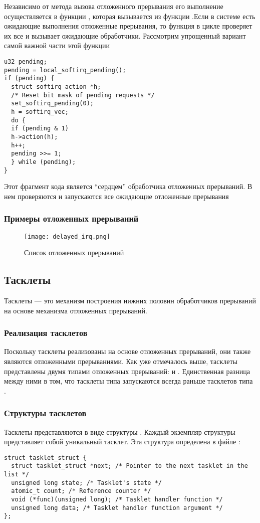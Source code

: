Независимо от метода вызова отложенного прерывания его выполнение осуществляется в функции , которая вызывается из функции .Если в системе есть ожидающие выполнения отложенные прерывания, то функция  в цикле проверяет их все и вызывает ожидающие обработчики. Рассмотрим упрощенный вариант самой важной части этой функции
\begin{lstlisting}
u32 pending;
pending = local_softirq_pending();
if (pending) {
  struct softirq_action *h;
  /* Reset bit mask of pending requests */
  set_softirq_pending(0);
  h = softirq_vec;
  do {
  if (pending & 1)
  h->action(h);
  h++;
  pending >>= 1;
  } while (pending);
}
\end{lstlisting}

Этот фрагмент кода является “сердцем” обработчика отложенных прерываний. В нем
проверяются и запускаются все ожидающие отложенные прерывания

\subsubsection{Примеры отложенных прерываний}

\begin{figure}[h]
\texttt{[image: delayed\_irq.png]}
\caption{Список отложенных прерываний}
\end{figure}

\subsection{Тасклеты}

Тасклеты — это механизм построения нижних половин обработчиков прерываний на
основе механизма отложенных прерываний.

\subsubsection{Реализация тасклетов}
Поскольку тасклеты реализованы на основе отложенных прерываний, они также являются отложенными прерываниями. Как уже отмечалось выше, тасклеты представлены
двумя типами отложенных прерываний:  и . Единственная разница между ними в том, что тасклеты типа  запускаются всегда раньше тасклетов типа .

\subsubsection{Структуры тасклетов}
Тасклеты представляются в виде структуры . Каждый экземпляр структуры представляет собой уникальный тасклет. Эта структура определена в файле :
\begin{lstlisting}
struct tasklet_struct {
  struct tasklet_struct *next; /* Pointer to the next tasklet in the list */
  unsigned long state; /* Tasklet's state */
  atomic_t count; /* Reference counter */
  void (*func)(unsigned long); /* Tasklet handler function */
  unsigned long data; /* Tasklet handler function argument */
};
\end{lstlisting}

